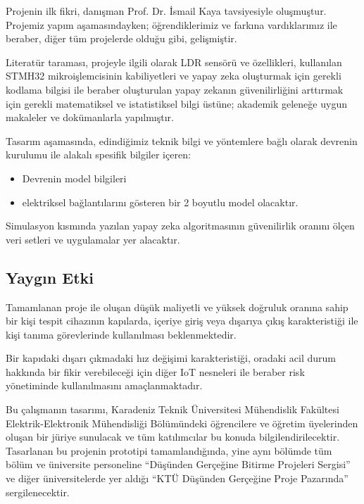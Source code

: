 Projenin ilk fikri, danışman Prof. Dr. İsmail Kaya tavsiyesiyle oluşmuştur. Projemiz yapım aşamasındayken; öğrendiklerimiz ve farkına vardıklarımız ile beraber, diğer tüm projelerde olduğu gibi, gelişmiştir.

Literatür taraması, projeyle ilgili olarak LDR sensörü ve özellikleri, kullanılan STMH32 mikroişlemcisinin kabiliyetleri ve yapay zeka oluşturmak için gerekli kodlama bilgisi ile beraber oluşturulan yapay zekanın güvenilirliğini arttırmak için gerekli matematiksel ve istatistiksel bilgi üstüne; akademik geleneğe uygun makaleler ve dokümanlarla yapılmıştır.

Tasarım aşamasında, edindiğimiz teknik bilgi ve yöntemlere bağlı olarak devrenin kurulumu ile alakalı spesifik bilgiler içeren:
\begin{itemize}
    \item Devrenin model bilgileri
    \item elektriksel bağlantılarını gösteren bir 2 boyutlu  model olacaktır.
\end{itemize}

Simulasyon kısmında yazılan yapay zeka algoritmasının güvenilirlik oranını ölçen veri setleri ve uygulamalar yer alacaktır.


\subsection{Yaygın Etki}

\begin{comment}
Yapılan çalışma ya da proje tamamlandığında sağlayacağı faydalar ne
olacaktır? Ulusal ve uluslararası bazda veya yerel olarak hangi soruna
çözüm getirecektir? Hangi yönleri ile dikkat çekecektir? İstihdam,
üretim, ekonomi, sağlık, çevre ve sosyal yönden ne gibi etkileri
olabilecektir? Yayın çıkarma potansiyeli var mıdır? Nerelerde
yayınlanabilir?
\end{comment}

Tamamlanan proje ile oluşan düşük maliyetli ve yüksek doğruluk oranına sahip bir kişi tespit cihazının kapılarda, içeriye giriş veya dışarıya çıkış karakteristiği ile kişi tanıma görevlerinde kullanılması beklenmektedir.

Bir kapıdaki dışarı çıkmadaki hız değişimi karakteristiği, oradaki acil durum hakkında bir fikir verebileceği için diğer IoT nesneleri ile beraber risk yönetiminde kullanılmasını amaçlanmaktadır.

Bu çalışmanın tasarımı, Karadeniz Teknik Üniversitesi Mühendislik Fakültesi Elektrik-Elektronik Mühendisliği Bölümündeki öğrencilere ve öğretim üyelerinden oluşan bir jüriye sunulacak ve tüm katılımcılar bu konuda bilgilendirilecektir. Tasarlanan bu projenin prototipi tamamlandığında, yine aynı bölümde tüm bölüm ve üniversite personeline “Düşünden Gerçeğine Bitirme Projeleri Sergisi” ve diğer üniversitelerde yer aldığı “KTÜ Düşünden Gerçeğine Proje Pazarında” sergilenecektir. 

